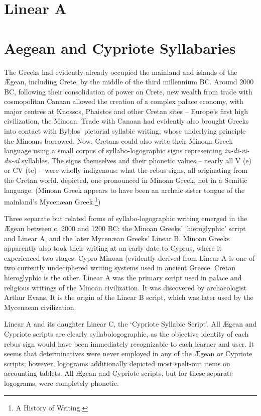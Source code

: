 \section{Linear A}
\label{s:lineara}

\section{Aegean and Cypriote Syllabaries}

The Greeks had evidently already occupied the mainland and islands of the
Ægean, including Crete, by the middle of the third millennium
BC. Around 2000 BC, following their consolidation of power on
Crete, new wealth from trade with cosmopolitan Canaan
allowed the creation of a complex palace economy, with major
centres at Knossos, Phaistos and other Cretan sites – Europe’s
first high civilization, the Minoan. Trade with Canaan had evidently
also brought Greeks into contact with Byblos’ pictorial
syllabic writing, whose underlying principle the Minoans borrowed.
Now, Cretans could also write their Minoan Greek language
using a small corpus of syllabo-logographic signs
representing \textit{in-di-vi-du-al} syllables. The signs themselves and
their phonetic values – nearly all V (e) or CV (te) – were wholly
indigenous: what the rebus signs, all originating from the
Cretan world, depicted, one pronounced in Minoan Greek, not
in a Semitic language. (Minoan Greek appears to have been an
archaic sister tongue of the mainland’s Mycenæan Greek.\footnote{A History of Writing. })

Three separate but related forms of syllabo-logographic
writing emerged in the Ægean between c. 2000 and 1200 BC: the
Minoan Greeks’ ‘hieroglyphic’ script and Linear A, and the
later Mycenæan Greeks’ Linear B. Minoan Greeks apparently
also took their writing at an early date to Cyprus, where it experienced
two stages: Cypro-Minoan (evidently derived from
Linear A is one of two currently undeciphered writing systems used in ancient Greece. Cretan hieroglyphic is the other. Linear A was the primary script used in palace and religious writings of the Minoan civilization. It was discovered by archaeologist Arthur Evans. It is the origin of the Linear B script, which was later used by the Mycenaean civilization.

Linear A and its daughter Linear C, the ‘Cypriote Syllabic
Script’. All Ægean and Cypriote scripts are clearly syllabologographic,
as the objective identity of each rebus sign would
have been immediately recognizable to each learner and user. It
seems that determinatives were never employed in any of the
Ægean or Cypriote scripts; however, logograms additionally
depicted most spelt-out items on accounting tablets. All Ægean
and Cypriote scripts, but for these separate logograms, were
completely phonetic.
\medskip

